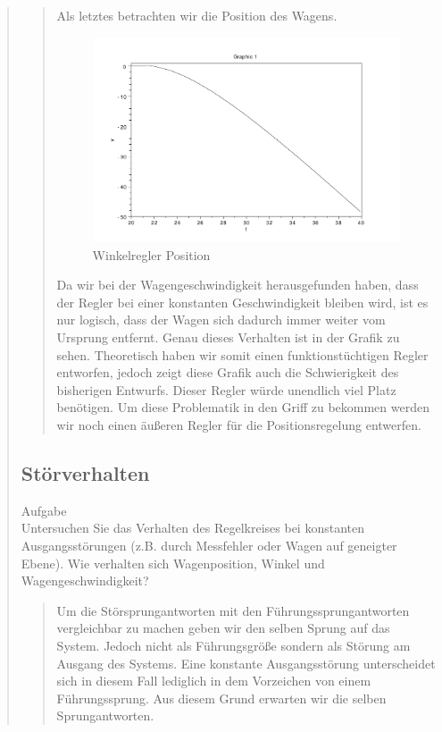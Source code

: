 \begin{quote}
\begin{quote}
        Als letztes betrachten wir die Position des Wagens.

        \begin{figure}[H]
        \centering
            \includegraphics[scale=0.7, trim = 0cm 0cm 0cm 0cm, clip]{./Bilder/Winkelregler_Position}
                \caption{Winkelregler Position}
        \end{figure}
        
        Da wir bei der Wagengeschwindigkeit herausgefunden haben, dass der Regler bei einer konstanten Geschwindigkeit
        bleiben wird, ist es nur logisch, dass der Wagen sich dadurch immer weiter vom Ursprung entfernt.
        Genau dieses Verhalten ist in der Grafik zu sehen. Theoretisch haben wir somit einen funktionstüchtigen Regler
        entworfen, jedoch zeigt diese Grafik auch die Schwierigkeit des bisherigen Entwurfs. Dieser Regler würde unendlich
        viel Platz benötigen. Um diese Problematik in den Griff zu bekommen werden wir noch einen äußeren Regler für die
        Positionsregelung entwerfen.
        
        
    \end{quote}  %
    
    \subsection{Störverhalten}
    Aufgabe\\
    Untersuchen Sie das Verhalten des Regelkreises bei konstanten Ausgangsstörungen (z.B. durch Messfehler oder Wagen
    auf geneigter Ebene). Wie verhalten sich Wagenposition, Winkel und Wagengeschwindigkeit?
    \begin{quote}
        Um die Störsprungantworten mit den Führungssprungantworten vergleichbar zu machen geben wir den selben Sprung auf das
        System. Jedoch nicht als Führungsgröße sondern als Störung am Ausgang des Systems. Eine konstante Ausgangsstörung
        unterscheidet sich in diesem Fall lediglich in dem Vorzeichen von einem Führungssprung. Aus diesem Grund erwarten wir die
        selben Sprungantworten.
        

\end{quote}
\end{quote}
